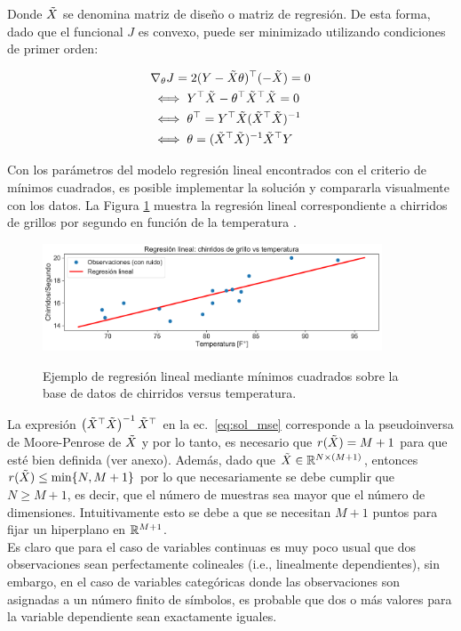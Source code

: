 Donde $\tilde{X}$ se denomina matriz de diseño o matriz de regresión. De esta forma, dado que el funcional $J$ es convexo, puede ser minimizado utilizando condiciones de primer orden:

\begin{align}
	&\nabla_\theta J= 2(Y-\tilde{X}\theta)^\top(-\tilde{X})=0\nonumber \\
	& \iff Y^\top\tilde{X} -\theta^\top\tilde{X}^\top\tilde{X} = 0\nonumber\\
	& \iff \theta^\top = Y^\top \tilde{X}(\tilde{X}^\top\tilde{X})^{-1}\nonumber\\
	& \iff \theta = (\tilde{X}^\top\tilde{X})^{-1}\tilde{X}^\top Y \label{eq:sol_mse}
\end{align}

Con los parámetros del modelo regresión lineal encontrados con el criterio de mínimos cuadrados, es posible implementar la solución y compararla visualmente con los datos. La Figura \ref{fig:reg_lin_1} muestra la regresión lineal correspondiente a chirridos de grillos por segundo en función de la temperatura \cite{insects}. 

\begin{figure}[H]
	\centering
	\includegraphics[width=0.9\textwidth]{img/cap2_chirridos.pdf}\\
	\caption{Ejemplo de regresión lineal mediante mínimos cuadrados sobre la base de datos de chirridos versus temperatura.}
	\label{fig:reg_lin_1}
\end{figure}

La expresión $\left(\tilde{X}^\top\tilde{X} \right)^{-1} \tilde{X}^\top$ en la ec.~\eqref{eq:sol_mse} corresponde a la pseudoinversa de Moore-Penrose de $\tilde{X}$ \cite[p.~7]{benisrael_greville_2006} y por lo tanto, es necesario que $r(\tilde{X})=M+1$  para que esté bien definida (ver anexo). Además, dado que $\tilde{X}\in\mathbb{R}^{N\times (M+1)}$, entonces $r(\tilde{X})\leq\min\{N,M+1\}$ por lo que necesariamente se debe cumplir que $N\geq M+1$, es decir, que el número de muestras sea mayor que el número de dimensiones. Intuitivamente esto se debe a que se necesitan $M+1$ puntos para fijar un hiperplano en $\mathbb{R}^{M+1}$.\\

Es claro que para el caso de variables continuas es muy poco usual que dos observaciones sean perfectamente colineales (i.e., linealmente dependientes), sin embargo, en el caso de variables categóricas donde las observaciones son asignadas a un número finito de símbolos, es probable que dos o más valores para la variable dependiente sean exactamente iguales. \\

